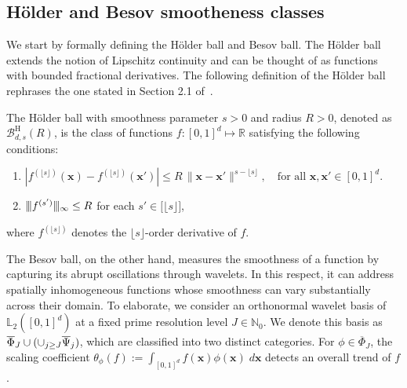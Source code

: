 \documentclass[twoside,11pt]{article}
\newcommand{\numbersetNonnegInt}{\mathbb{N}_0}
\newcommand{\Ell}{\mathbb{L}}
\newcommand{\EllTwo}{\Ell_2} %
\newcommand{\vectorize}[1]{\mathbf{#1}}
\newcommand{\dimDensity}{d} %
\newcommand{\smoothness}{s}
\newcommand{\ballRadius}{R}
\newcommand{\wavFatherFunc}{\phi}
\newcommand{\WavMotherBasisSet}{\overline{\uppercase{\Psi}}}
\newcommand{\resLev}{j}
\newcommand{\primResLev}{J}
\newcommand{\wavCoef}{\theta}
\newcommand{\multivInhomoWavFatherBasis}{\overline{\Phi}_{\primResLev}}
\newcommand{\wavGenericFatherCoef}{\wavCoef_{\wavFatherFunc}}
\newcommand{\domainTs}{
	[0,1]^{{\dimDensity}}
}
\newcommand{\ballDistn}{\mathcal{B}}
\newcommand{\holderBall}{\ballDistn_{\dimDensity, \smoothness}^{\mathrm{H}}(\ballRadius)} %
\begin{document}
\subsection{H\"{o}lder and Besov smootheness classes}\label{subsection:smoothness_class}
We start by formally defining the H\"{o}lder ball and Besov ball.
The H\"{o}lder ball extends the notion of Lipschitz continuity and can be thought of as functions with bounded fractional derivatives.
The following definition of the H\"{o}lder ball rephrases the one stated in Section 2.1 of~\citet{Arias-Castro2018RememberDimension}.
\begin{definition} \label{def:holder_ball}
	The H\"{o}lder ball with smoothness parameter \( \smoothness > 0 \) and radius \( R > 0 \), denoted as $\holderBall$, is the class of functions \( f : [0,1]^d \mapsto \mathbb{R} \) satisfying the following conditions:
	\begin{enumerate}
		\item  
		$
		\left| f^{(\lfloor \smoothness \rfloor)}(\vectorize{x}) - f^{(\lfloor \smoothness \rfloor)}(\vectorize{x}') \right| \leq R \, \| \vectorize{x} - \vectorize{x}' \|^{\smoothness - \lfloor \smoothness \rfloor}, \quad \text{for all } \vectorize{x}, \vectorize{x}' \in [0,1]^\dimDensity.
		$
		\item  
		$\vert\kern-0.25ex\vert\kern-0.25ex\vert f^{(s')} 
		\vert\kern-0.25ex \vert\kern-0.25ex \vert_\infty \leq R
		$ for each $s' \in \bigl[ \lfloor \smoothness \rfloor \bigr]$,
	\end{enumerate}
	where $f^{(\lfloor \smoothness \rfloor)}$ denotes the $\lfloor \smoothness \rfloor$-order derivative of $f$.
\end{definition}
The Besov ball, on the other hand, measures the smoothness of a function by capturing its abrupt oscillations through wavelets.
In this respect, it can address spatially inhomogeneous functions whose smoothness can vary substantially across their domain.
To elaborate, we consider an orthonormal wavelet basis of $\EllTwo(\domainTs)$ at a fixed prime resolution level $\primResLev \in \numbersetNonnegInt$.
We denote this basis as $\multivInhomoWavFatherBasis
\cup (\cup_{\resLev \geq \primResLev}
\WavMotherBasisSet_{\resLev})$, which are classified into two distinct categories.
For $\wavFatherFunc \in \multivInhomoWavFatherBasis$, the scaling coefficient 
$\wavGenericFatherCoef(f)
:=
\int_{[0,1]^d}
f(\vectorize{x})
\wavFatherFunc(\vectorize{x})
\;
d\vectorize{x}$
detects an overall trend of $f$.
\end{document}
